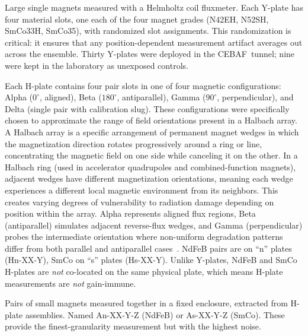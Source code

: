 \documentclass[11pt,letterpaper]{article}
\newcommand{\CEBAF}{CEBAF}
\begin{document}
\begin{description}[style=nextline]
    \item[Y-plates (primary measurement)]
    Large single magnets measured with a Helmholtz coil fluxmeter. Each Y-plate
    has four material slots, one each of the four magnet grades (N42EH, N52SH,
    SmCo33H, SmCo35), with randomized slot assignments. This
    randomization is critical: it ensures that any position-dependent
    measurement artifact averages out across the ensemble. Thirty Y-plates were
    deployed in the \CEBAF~tunnel; nine were kept in the laboratory as
    unexposed controls.

    \item[H-plates (pair assemblies)]
    Each H-plate contains four pair slots in one of four magnetic
    configurations: Alpha ($0^\circ$, aligned), Beta ($180^\circ$,
    antiparallel), Gamma ($90^\circ$, perpendicular), and Delta
    (single pair with calibration slug). These configurations were specifically
    chosen to approximate the range of field orientations present in a Halbach
    array. A Halbach array is a specific arrangement of permanent magnet wedges
    in which the magnetization direction rotates progressively around a ring or
    line, concentrating the magnetic field on one side while canceling it on the
    other. In a Halbach ring (used in accelerator quadrupoles and
    combined-function magnets), adjacent wedges have different magnetization
    orientations, meaning each wedge experiences a different local magnetic
    environment from its neighbors. This creates varying degrees of
    vulnerability to radiation damage depending on position within the array.
    Alpha represents aligned flux regions, Beta (antiparallel) simulates
    adjacent reverse-flux wedges, and Gamma (perpendicular) probes the
    intermediate orientation where non-uniform degradation patterns differ from
    both parallel and antiparallel cases~\cite{Brooks2022_IPAC,Brooks2021_IPAC}.
    NdFeB pairs are on ``n'' plates (Hn-XX-Y), SmCo on ``s'' plates
    (Hs-XX-Y). Unlike Y-plates, NdFeB and SmCo H-plates are \emph{not}
    co-located on the same physical plate, which means H-plate measurements
    are \emph{not} gain-immune.

    \item[A-samples (individual magnets)]
    Pairs of small magnets measured together in a fixed enclosure, extracted
    from H-plate assemblies. Named An-XX-Y-Z (NdFeB) or As-XX-Y-Z (SmCo).
    These provide the finest-granularity measurement but with the highest
    noise.
\end{description}
\end{document}
